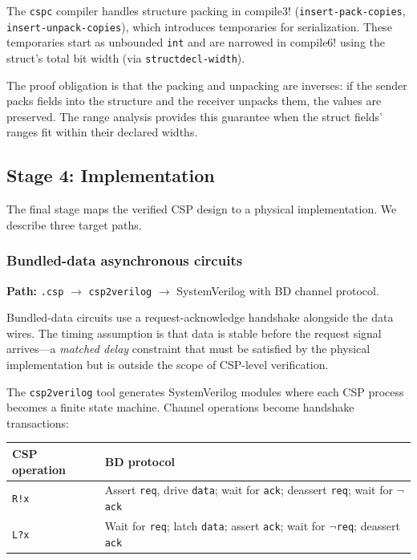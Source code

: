 \documentclass[11pt]{article}
\begin{document}
The \texttt{cspc} compiler handles structure packing in compile3!
(\texttt{insert-pack-copies}, \texttt{insert-unpack-copies}), which
introduces temporaries for serialization.  These temporaries start as
unbounded \texttt{int} and are narrowed in compile6! using the
struct's total bit width (via \texttt{structdecl-width}).

The proof obligation is that the packing and unpacking are inverses:
if the sender packs fields into the structure and the receiver unpacks
them, the values are preserved.  The range analysis provides this
guarantee when the struct fields' ranges fit within their declared
widths.

\subsection{Stage 4: Implementation}
\label{sec:stage4}

The final stage maps the verified CSP design to a physical
implementation.  We describe three target paths.

\subsubsection{Bundled-data asynchronous circuits}
\label{sec:bd}

\textbf{Path:} \texttt{.csp} $\to$ \texttt{csp2verilog} $\to$
SystemVerilog with BD channel protocol.

Bundled-data circuits use a request-acknowledge handshake alongside
the data wires.  The timing assumption is that data is stable before
the request signal arrives---a \emph{matched delay} constraint that
must be satisfied by the physical implementation but is outside the
scope of CSP-level verification.

The \texttt{csp2verilog} tool generates SystemVerilog modules where
each CSP process becomes a finite state machine.  Channel operations
become handshake transactions:

\begin{center}
\begin{tabular}{ll}
\toprule
\textbf{CSP operation} & \textbf{BD protocol} \\
\midrule
\texttt{R!x} & Assert \texttt{req}, drive \texttt{data}; wait for
  \texttt{ack}; deassert \texttt{req}; wait for $\neg$\texttt{ack} \\
\texttt{L?x} & Wait for \texttt{req}; latch \texttt{data}; assert
  \texttt{ack}; wait for $\neg$\texttt{req}; deassert \texttt{ack} \\
\bottomrule
\end{tabular}
\end{center}
\end{document}
